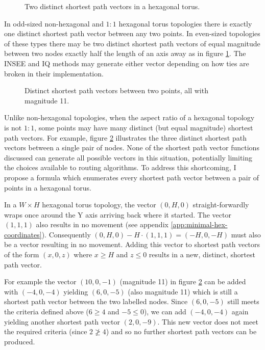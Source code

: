 			\begin{figure}
				\center
				
				\caption{Two distinct shortest path vectors in a hexagonal torus.}
				\label{fig:wrap-alternatives}
			\end{figure}
			
			In odd-sized non-hexagonal and $1:1$ hexagonal torus topologies there is
			exactly one distinct shortest path vector between any two points. In
			even-sized topologies of these types there may be two distinct shortest
			path vectors of equal magnitude between two nodes exactly half the length
			of an axis away as in figure \ref{fig:wrap-alternatives}. The INSEE and
			IQ methods may generate either vector depending on how ties are broken in
			their implementation.
			
			\begin{figure}
				\center
				
				\caption{Distinct shortest path vectors between two points, all with
				magnitude 11.}
				\label{fig:spiralling}
			\end{figure}
			
			Unlike non-hexagonal topologies, when the aspect ratio of a hexagonal
			topology is not $1:1$, some points may have many distinct (but equal
			magnitude) shortest path vectors.  For example, figure
			\ref{fig:spiralling} illustrates the three distinct shortest path vectors
			between a single pair of nodes. None of the shortest path vector
			functions discussed can generate all possible vectors in this situation,
			potentially limiting the choices available to routing algorithms.  To
			address this shortcoming, I propose a formula which enumerates every
			shortest path vector between a pair of points in a hexagonal torus.
			
			In a $W \times H$ hexagonal torus topology, the vector $(0, H, 0)$
			straight-forwardly wraps once around the Y axis arriving back where it
			started. The vector $(1,1,1)$ also results in no movement (see appendix
			\ref{app:minimal-hex-coordinates}).  Consequently $(0,H,0) -
			H\cdot(1,1,1) = (-H, 0, -H)$ must also be a vector resulting in no
			movement.  Adding this vector to shortest path vectors of the form $(x,
			0, z)$ where $x\ge H$ and $z\le0$ results in a new, distinct, shortest
			path vector.
			
			For example the vector $(10, 0, -1)$ (magnitude 11) in figure
			\ref{fig:spiralling} can be added with $(-4, 0, -4)$ yielding $(6, 0,
			-5)$ (also magnitude 11) which is still a shortest path vector between
			the two labelled nodes.  Since $(6, 0, -5)$ still meets the criteria
			defined above ($6 \ge 4$ and $-5 \le 0$), we can add $(-4, 0, -4)$ again
			yielding another shortest path vector $(2, 0, -9)$.  This new vector does
			not meet the required criteria (since $2 \ngeq 4$) and so no further
			shortest path vectors can be produced.
			

